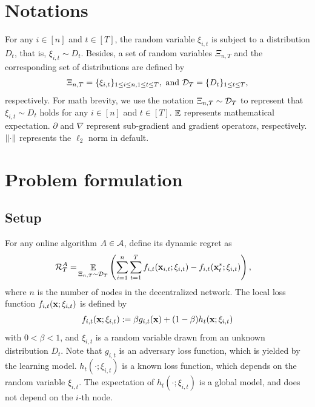 \documentclass{article}
\begin{document}
\section{Notations}
For any $i\in[n]$ and $t\in[T]$, the random variable $\xi_{i,t}$ is subject to a distribution $D_t$, that is, $\xi_{i,t} \sim D_t$. Besides, a set of random variables $\Xi_{n,T}$ and the corresponding set of distributions are defined by
\begin{align}
\nonumber
\Xi_{n,T} = \{ \xi_{i,t} \}_{1\le i \le n, 1 \le t \le T}, \text{~and~} \mathcal{D}_{T} = \{ D_t \}_{1 \le t \le T},
\end{align} respectively. For math brevity, we use the notation $\Xi_{n,T} \sim \mathcal{D}_{T}$ to represent that $\xi_{i,t} \sim D_t$ holds for any $i\in[n]$ and $t\in[T]$.  $\mathop{\mathbb{E}}$ represents mathematical expectation. $\partial$ and $\nabla$ represent sub-gradient and gradient operators, respectively. $\left\lVert\cdot\right\rVert$ represents the $\ell_2$ norm in default. 


\section{Problem formulation}

\subsection{Setup}
For any online algorithm $A \in {\mathcal{A}}$, define its dynamic regret as
\begin{align}
\label{equa_definition_our_regret}
{\mathcal{R}}_T^{A} = & \mathop{\mathbb{E}}_{ \Xi_{n,T} \sim \mathcal{D}_{T} } \left(  \sum_{i=1}^n\sum_{t=1}^T f_{i,t}({\bf x}_{i,t};\xi_{i,t}) - f_{i,t}({\bf x}_t^\ast;\xi_{i,t})  \right),
\end{align} where $n$ is the number of nodes in the decentralized network. The local loss function $f_{i,t}({\bf x};\xi_{i,t})$ is defined by
\begin{align}
\nonumber
f_{i,t}({\bf x};\xi_{i,t}) := \beta g_{i,t}({\bf x}) + (1-\beta) h_t({\bf x}; \xi_{i,t})
\end{align} with $0<\beta<1$, and $\xi_{i,t}$ is a random variable drawn from an unknown distribution $D_t$. Note that $g_{i,t}$ is an adversary loss function, which is yielded by the learning model. $h_t(\cdot; \xi_{i,t})$ is a known loss function, which   depends on the random variable $\xi_{i,t}$. The expectation of $h_t(\cdot; \xi_{i,t})$ is a global model, and does not depend on the $i$-th node. 
\end{document}
